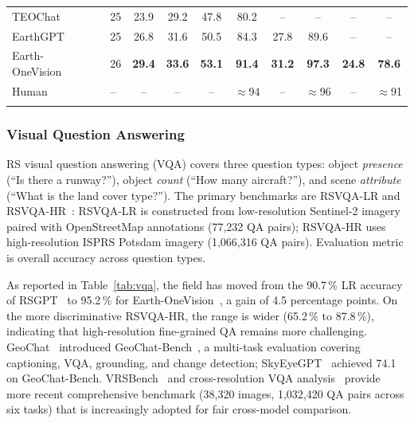 \begin{table}[t]
\begin{tabular*}{\textwidth}{@{\extracolsep\fill}lp{0.28cm}cccc cc cc}
TEOChat~\cite{teochat2025}                & 25 & 23.9 & 29.2 & 47.8 & 80.2 & -- & -- & -- & -- \\
EarthGPT~\cite{earthgpt2025}              & 25 & 26.8 & 31.6 & 50.5 & 84.3 & 27.8 & 89.6 & -- & -- \\
Earth-OneVision~\cite{earthonevision2026} & 26 & \textbf{29.4} & \textbf{33.6} & \textbf{53.1} & \textbf{91.4} & \textbf{31.2} & \textbf{97.3} & \textbf{24.8} & \textbf{78.6} \\
\midrule
Human~\cite{rsicd2017}                    & -- & -- & -- & -- & $\approx$94 & -- & $\approx$96 & -- & $\approx$91 \\
\botrule
\end{tabular*}
\end{table}

\subsubsection{Visual Question Answering}\label{sec4:vqa}

RS visual question answering (VQA) covers three question types: object
\emph{presence} (``Is there a runway?''), object \emph{count} (``How many
aircraft?''), and scene \emph{attribute} (``What is the land cover type?'').
The primary benchmarks are RSVQA-LR and RSVQA-HR~\cite{rsvqa2020}:
RSVQA-LR is constructed from low-resolution Sentinel-2 imagery paired with
OpenStreetMap annotations (77,232 QA pairs); RSVQA-HR uses high-resolution
ISPRS Potsdam imagery (1,066,316 QA pairs). Evaluation metric is overall
accuracy across question types.

As reported in Table~\ref{tab:vqa}, the field has moved from the 90.7\,\%
LR accuracy of RSGPT~\cite{rsgpt2023} to 95.2\,\% for Earth-OneVision~\cite{earthonevision2026},
a gain of 4.5 percentage points. On the more discriminative RSVQA-HR,
the range is wider (65.2\,\% to 87.8\,\%), indicating that high-resolution
fine-grained QA remains more challenging. GeoChat~\cite{geochat2024}
introduced GeoChat-Bench~\cite{kuckreja2024geobench}, a multi-task evaluation covering captioning, VQA,
grounding, and change detection; SkyEyeGPT~\cite{skyeyegpt2025} achieved
74.1 on GeoChat-Bench. VRSBench~\cite{vrsbench2024} and cross-resolution VQA analysis~\cite{vrsbench2024b} provide more recent
comprehensive benchmark (38,320 images, 1,032,420 QA pairs across six tasks)
that is increasingly adopted for fair cross-model comparison.

